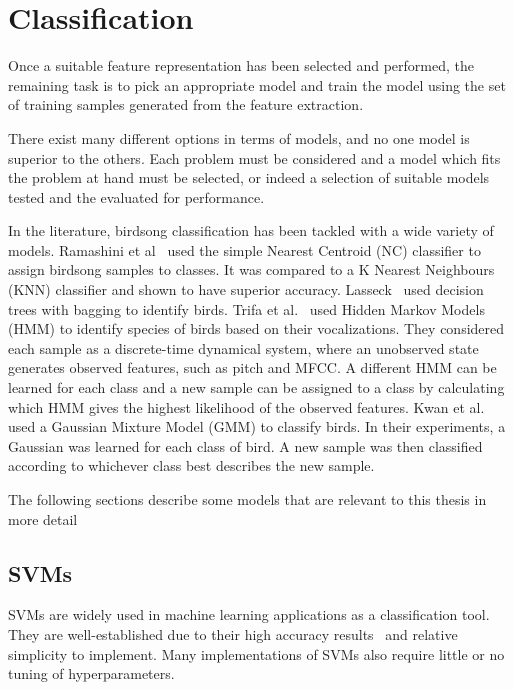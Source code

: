 \section{Classification}\label{sec:classification}

Once a suitable feature representation has been selected and performed, the
remaining task is to pick an appropriate model and train the model using the set
of training samples generated from the feature extraction.

There exist many different options in terms of models, and no one model is
superior to the others. Each problem must be considered and a model which fits
the problem at hand must be selected, or indeed a selection of suitable models
tested and the evaluated for performance.

In the literature, birdsong classification has been tackled with a wide variety
of models. Ramashini et al~\cite{ramashini2019bird} used the simple Nearest
Centroid (NC) classifier to assign birdsong samples to classes. It was compared
to a K Nearest Neighbours (KNN) classifier and shown to have superior accuracy.
Lasseck~\cite{lasseck2015improved} used decision trees with bagging to identify
birds. Trifa et al.~\cite{trifa2008automated} used Hidden Markov Models (HMM) to
identify species of birds based on their vocalizations. They considered each
sample as a discrete-time dynamical system, where an unobserved state generates
observed features, such as pitch and MFCC\@. A different HMM can be learned for
each class and a new sample can be assigned to a class by calculating which HMM
gives the highest likelihood of the observed features. Kwan et
al.~\cite{kwan2006automated} used a Gaussian Mixture Model (GMM) to classify
birds. In their experiments, a Gaussian was learned for each class of bird. A
new sample was then classified according to whichever class best describes the
new sample.

The following sections describe some models that are relevant to this thesis in
more detail

\subsection{SVMs}

SVMs are widely used in machine learning applications as a classification tool.
They are well-established due to their high accuracy
results~\cite{fagerlund2007bird} and relative simplicity to implement. Many
implementations of SVMs also require little or no tuning of hyperparameters.

